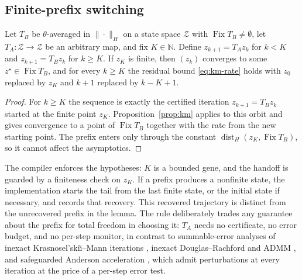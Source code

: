 \subsection{Finite-prefix switching}

\begin{lemma}
\label{lem:switchk}
Let $T_B$ be $\theta$-averaged in $\|\cdot\|_H$ on a state space
$\mathcal Z$ with $\operatorname{Fix}T_B\neq\emptyset$, let
$T_A:\mathcal Z\to\mathcal Z$ be an arbitrary map, and fix
$K\in\mathbb N$. Define $z_{k+1}=T_Az_k$ for $k<K$ and $z_{k+1}=T_Bz_k$
for $k\geq K$. If $z_K$ is finite, then $(z_k)$ converges to some
$z^\star\in\operatorname{Fix}T_B$, and for every $k\geq K$ the residual
bound \eqref{eq:km-rate} holds with $z_0$ replaced by $z_K$ and $k+1$
replaced by $k-K+1$.
\end{lemma}

\begin{proof}
For $k\geq K$ the sequence is exactly the certified iteration
$z_{k+1}=T_Bz_k$ started at the finite point $z_K$.
Proposition~\ref{prop:km} applies to this orbit and gives convergence to a
point of $\operatorname{Fix}T_B$ together with the rate from the new
starting point. The prefix enters only through the constant
$\operatorname{dist}_H(z_K,\operatorname{Fix}T_B)$, so it cannot affect the
asymptotics.
\end{proof}

The compiler enforces the hypotheses: $K$ is a bounded gene, and the
handoff is guarded by a finiteness check on $z_K$. If a prefix produces
a nonfinite state, the implementation starts the tail from the last finite
state, or the initial state if necessary, and records that recovery. This
recovered trajectory is distinct from the unrecovered prefix in the lemma.
The rule deliberately trades any guarantee about the prefix for total
freedom in choosing it: $T_A$ needs no certificate, no error budget, and no
per-step monitor, in contrast to summable-error analyses of inexact
Krasnosel'ski\u{\i}--Mann iterations
\citep{Combettes2001QuasiFejerian,Combettes2004Solving}, inexact
Douglas--Rachford and ADMM \citep{EcksteinBertsekas1992Douglas}, and
safeguarded Anderson acceleration \citep{Zhang2020Globally}, which admit
perturbations at every iteration at the price of a per-step error test.

\FloatBarrier
